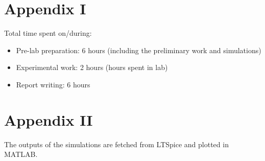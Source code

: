 \documentclass[letterpaper,12pt]{article}
\begin{document}
\section*{Appendix I}
Total time spent on/during:
\begin{itemize}
	\item Pre-lab preparation: 6 hours (including the preliminary work and simulations) 
	\item Experimental work: 2 hours (hours spent in lab)
	\item Report writing: 6 hours 
\end{itemize}
\section*{Appendix II}
The outputs of the simulations are fetched from LTSpice and plotted in MATLAB.



\end{document}
